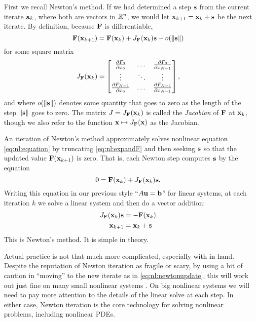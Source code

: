 First we recall Newton's method.  If we had determined a step $\mathbf{s}$ from the current iterate $\mathbf{x}_k$, where both are vectors in $\mathbb{R}^n$, we would let $\mathbf{x}_{k+1} = \mathbf{x}_k + \mathbf{s}$ be the next iterate.  By definition, because $\mathbf{F}$ is differentiable,
\begin{equation}
    \mathbf{F}(\mathbf{x}_{k+1}) = \mathbf{F}(\mathbf{x}_k) + J_{\mathbf{F}}(\mathbf{x}_k) \mathbf{s} + o(\|\mathbf{s}\|)  \label{eq:nl:expandF}
\end{equation}
for some square matrix
\begin{equation}
J_{\mathbf{F}}(\mathbf{x}_k) = \begin{bmatrix}
    \frac{\partial F_0}{\partial x_0} & \dots & \frac{\partial F_0}{\partial x_{N-1}} \\
    \vdots & \ddots & \vdots \\
    \frac{\partial F_{N-1}}{\partial x_0} & \dots & \frac{\partial F_{N-1}}{\partial x_{N-1}}  \end{bmatrix},  \label{eq:nl:jacdefn}
\end{equation}
and where $o(\|\mathbf{s}\|)$ denotes some quantity that goes to zero as the length of the step $\|\mathbf{s}\|$ goes to zero.  The matrix $J = J_{\mathbf{F}}(\mathbf{x}_k)$ is called the \emph{Jacobian} of $\mathbf{F}$ at $\mathbf{x}_k$, though we also refer to the function $\mathbf{x} \mapsto J_{\mathbf{F}}(\mathbf{x})$ as the Jacobian.

An iteration of Newton's method approximately solves nonlinear equation \eqref{eq:nl:equation} by truncating \eqref{eq:nl:expandF} and then seeking $\mathbf{s}$ so that the updated value $\mathbf{F}(\mathbf{x}_{k+1})$ is zero.  That is, each Newton step computes $\mathbf{s}$ by the equation
\begin{equation}
    0 = \mathbf{F}(\mathbf{x}_k) + J_{\mathbf{F}}(\mathbf{x}_k) \mathbf{s}.
\end{equation}
Writing this equation in our previous style ``$A\mathbf{u}=\mathbf{b}$'' for linear systems, at each iteration $k$ we solve a linear system and then do a vector addition:
\begin{align}
    J_{\mathbf{F}}(\mathbf{x}_k) \mathbf{s} &= - \mathbf{F}(\mathbf{x}_k)  \label{eq:nl:newtoneq}  \\
    \mathbf{x}_{k+1} &= \mathbf{x}_k + \mathbf{s}  \label{eq:nl:newtonupdate}
\end{align}
This is Newton's method.  It is simple in theory.

Actual practice is not that much more complicated, especially with \PETSc in hand.  Despite the reputation of Newton iteration as fragile or scary, by using a bit of caution in ``moving'' to the new iterate as in \eqref{eq:nl:newtonupdate}, this will work out just fine on many small nonlinear systems \citep{Kelley2003}.  On big nonlinear systems we will need to pay more attention to the details of the linear solve at each step.  In either case, Newton iteration is the core technology for solving nonlinear problems, including nonlinear PDEs.

